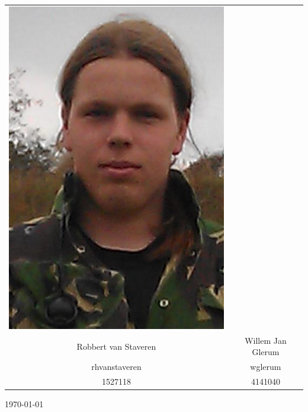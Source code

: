 \begin{titlepage}
\begin{center}
\begin{table}[ht]
\begin{tabular}{cc}
\includegraphics[scale=0.2]{willem.png}  \\
Robbert van Staveren	& Willem Jan Glerum\\
rhvanstaveren 			& wglerum\\
1527118					& 4141040\\
\end{tabular}
\end{table}

\vfill
{\large \today}
\end{center}

\end{titlepage}